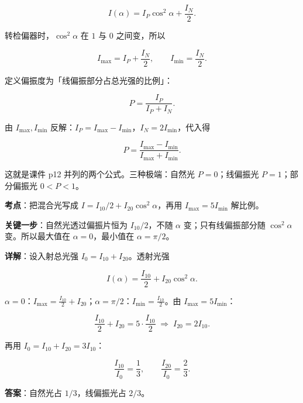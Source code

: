 \documentclass[11pt]{ctexart}
\begin{document}
\[
I(\alpha)=I_P\cos^2\alpha+\frac{I_N}{2}.
\]

转检偏器时，$\cos^2\alpha$ 在 $1$ 与 $0$ 之间变，所以

\[
I_{\max}=I_P+\frac{I_N}{2},\qquad I_{\min}=\frac{I_N}{2}.
\]


定义偏振度为「线偏振部分占总光强的比例」：

\[
P=\frac{I_P}{I_P+I_N}.
\]

由 $I_{\max},I_{\min}$ 反解：$I_P=I_{\max}-I_{\min}$，$I_N=2I_{\min}$，代入得

\[
P=\frac{I_{\max}-I_{\min}}{I_{\max}+I_{\min}}.
\]

这就是课件 p12 并列的两个公式。三种极端：自然光 $P=0$；线偏振光 $P=1$；部分偏振光 $0<P<1$。



\qbreak
{}

\textbf{考点}：把混合光写成 $I=I_{10}/2+I_{20}\cos^2\alpha$，再用 $I_{\max}=5I_{\min}$ 解比例。

\textbf{关键一步}：自然光透过偏振片恒为 $I_{10}/2$，不随 $\alpha$ 变；只有线偏振部分随 $\cos^2\alpha$ 变。所以最大值在 $\alpha=0$，最小值在 $\alpha=\pi/2$。

\textbf{详解}：设入射总光强 $I_0=I_{10}+I_{20}$。透射光强

\[
I(\alpha)=\frac{I_{10}}{2}+I_{20}\cos^2\alpha .
\]

$\alpha=0$：$I_{\max}=\frac{I_{10}}{2}+I_{20}$；$\alpha=\pi/2$：$I_{\min}=\frac{I_{10}}{2}$。由 $I_{\max}=5I_{\min}$：

\[
\frac{I_{10}}{2}+I_{20}=5\cdot\frac{I_{10}}{2}
\;\Longrightarrow\;
I_{20}=2I_{10}.
\]

再用 $I_0=I_{10}+I_{20}=3I_{10}$：

\[
\frac{I_{10}}{I_0}=\frac13,\qquad \frac{I_{20}}{I_0}=\frac23 .
\]

\textbf{答案}：自然光占 $1/3$，线偏振光占 $2/3$。
\end{document}
